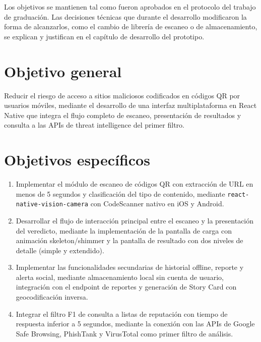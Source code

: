 \label{chap:objetivos}
Los objetivos se mantienen tal como fueron aprobados en el protocolo del trabajo de graduación. Las decisiones técnicas que durante el desarrollo modificaron la forma de alcanzarlos, como el cambio de librería de escaneo o de almacenamiento, se explican y justifican en el capítulo de desarrollo del prototipo.

\section{Objetivo general}

Reducir el riesgo de acceso a sitios maliciosos codificados en códigos QR por usuarios móviles, mediante el desarrollo de una interfaz multiplataforma en React Native que integra el flujo completo de escaneo, presentación de resultados y consulta a las APIs de threat intelligence del primer filtro.

\section{Objetivos específicos}

\begin{enumerate}
	\item Implementar el módulo de escaneo de códigos QR con extracción de URL en menos de 5 segundos y clasificación del tipo de contenido, mediante \texttt{react-native-vision-camera} con CodeScanner nativo en iOS y Android.
	\item Desarrollar el flujo de interacción principal entre el escaneo y la presentación del veredicto, mediante la implementación de la pantalla de carga con animación skeleton/shimmer y la pantalla de resultado con dos niveles de detalle (simple y extendido).
	\item Implementar las funcionalidades secundarias de historial offline, reporte y alerta social, mediante almacenamiento local sin cuenta de usuario, integración con el endpoint de reportes y generación de Story Card con geocodificación inversa.
	\item Integrar el filtro F1 de consulta a listas de reputación con tiempo de respuesta inferior a 5 segundos, mediante la conexión con las APIs de Google Safe Browsing, PhishTank y VirusTotal como primer filtro de análisis.
\end{enumerate}
